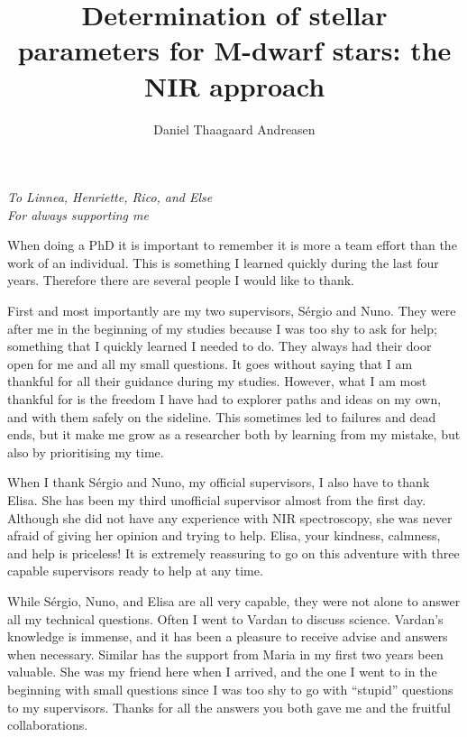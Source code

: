 \documentclass[fleqn]{fcup-thesis}
\author{Daniel Thaagaard Andreasen}
\title{Determination of stellar parameters for M-dwarf stars: the NIR approach}
\begin{document}
\begin{preliminary}

\maketitle
\cleardoublepage


\begin{dedication}
\centering \huge \itshape
To Linnea, Henriette, Rico, and Else\\For always supporting me
\end{dedication}


\begin{acknowledgements}

When doing a PhD it is important to remember it is more a team effort than the work of an
individual. This is something I learned quickly during the last four years. Therefore there are
several people I would like to thank.

First and most importantly are my two supervisors, S\'{e}rgio and Nuno. They were after me in the
beginning of my studies because I was too shy to ask for help; something that I quickly learned I
needed to do. They always had their door open for me and all my small questions. It goes without
saying that I am thankful for all their guidance during my studies. However, what I am most thankful
for is the freedom I have had to explorer paths and ideas on my own, and with them safely on the
sideline. This sometimes led to failures and dead ends, but it make me grow as a researcher both by
learning from my mistake, but also by prioritising my time.

When I thank S\'{e}rgio and Nuno, my official supervisors, I also have to thank Elisa. She has been
my third unofficial supervisor almost from the first day. Although she did not have any experience
with NIR spectroscopy, she was never afraid of giving her opinion and trying to help. Elisa, your
kindness, calmness, and help is priceless! It is extremely reassuring to go on this adventure with
three capable supervisors ready to help at any time.

While S\'{e}rgio, Nuno, and Elisa are all very capable, they were not alone to answer all my
technical questions. Often I went to Vardan to discuss science. Vardan's knowledge is immense, and
it has been a pleasure to receive advise and answers when necessary. Similar has the support from
Maria in my first two years been valuable. She was my friend here when I arrived, and the one I went
to in the beginning with small questions since I was too shy to go with ``stupid'' questions to my
supervisors. Thanks for all the answers you both gave me and the fruitful collaborations.


\end{acknowledgements}
\end{preliminary}
\end{document}
